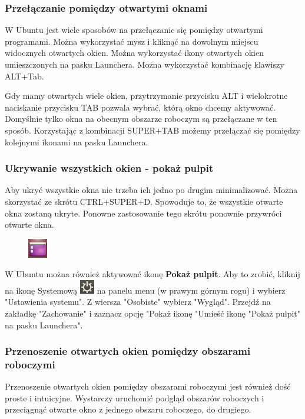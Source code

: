\subsubsection{Przełączanie pomiędzy otwartymi oknami}
W Ubuntu jest wiele sposobów na przełączanie się pomiędzy otwartymi programami. Można wykorzystać
mysz i kliknąć na dowolnym miejscu widocznych otwartych okien. Można wykorzystać ikony otwartych okien umieszczonych na pasku Launchera. Można wykorzystać kombinację klawiszy ALT+Tab. 

Gdy mamy otwartych wiele okien, przytrzymanie przycisku ALT i wielokrotne naciskanie przycisku TAB pozwala wybrać, którą okno chcemy aktywować. Domyślnie tylko okna na obecnym obszarze roboczym są przełączane w ten sposób. Korzystając z kombinacji SUPER+TAB możemy przełączać się pomiędzy kolejnymi ikonami na pasku Launchera.

\subsubsection{Ukrywanie wszystkich okien - pokaż pulpit}
Aby ukryć wszystkie okna  nie trzeba ich jedno po drugim minimalizować. Można skorzystać ze skrótu CTRL+SUPER+D. Spowoduje to, że wszystkie otwarte okna zostaną ukryte. Ponowne zastosowanie tego skrótu ponownie przywróci otwarte okna.

\begin{figure}
                \includegraphics[width=0.075\textwidth]{images/ikony_pokaz_pulpit.png}
\end{figure}

W Ubuntu można również aktywować ikonę \textbf{Pokaż pulpit}. Aby to zrobić, kliknij na ikonę Systemową \includegraphics[scale=1]{images/ikony_zasilanie.png} na panelu menu (w prawym górnym rogu) i wybierz "Ustawienia systemu". Z wiersza "Osobiste" wybierz "Wygląd". Przejdź na zakładkę "Zachowanie" i zaznacz opcję "Pokaż ikonę "Umieść ikonę "Pokaż pulpit" na pasku Launchera".
\clearpage
\subsubsection{Przenoszenie otwartych okien pomiędzy obszarami roboczymi}
Przenoszenie otwartych okien pomiędzy obszarami roboczymi jest również dość proste i intuicyjne. Wystarczy uruchomić podgląd obszarów roboczych i przeciągnąć otwarte okno z jednego obszaru roboczego, do drugiego.

